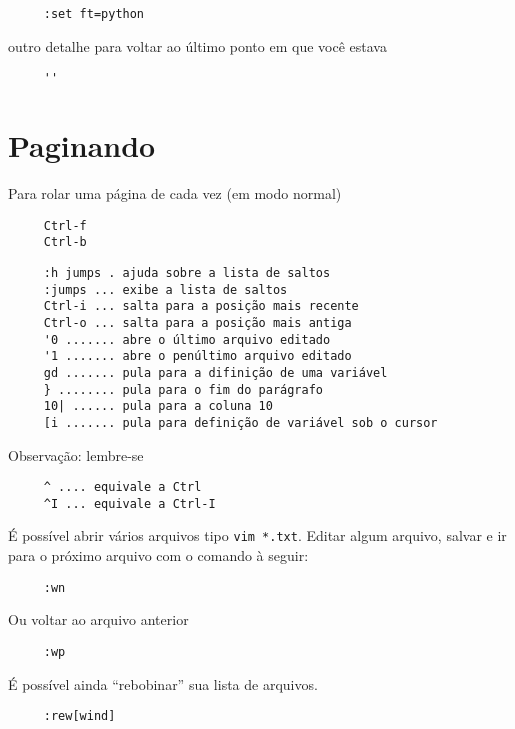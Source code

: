 \begin{verbatim}
     :set ft=python
\end{verbatim}

outro detalhe para voltar ao último ponto em que você estava

\begin{verbatim}
     ''
\end{verbatim}

\section{Paginando}
\label{Paginando}

Para rolar uma página de cada vez (em modo normal)

\begin{verbatim}
     Ctrl-f
     Ctrl-b
\end{verbatim}


\begin{verbatim}
     :h jumps . ajuda sobre a lista de saltos
     :jumps ... exibe a lista de saltos
     Ctrl-i ... salta para a posição mais recente
     Ctrl-o ... salta para a posição mais antiga
     '0 ....... abre o último arquivo editado
     '1 ....... abre o penúltimo arquivo editado
     gd ....... pula para a difinição de uma variável
     } ........ pula para o fim do parágrafo
     10| ...... pula para a coluna 10
     [i ....... pula para definição de variável sob o cursor
\end{verbatim}

Observação: lembre-se

\begin{verbatim}
     ^ .... equivale a Ctrl
     ^I ... equivale a Ctrl-I
\end{verbatim}

É possível abrir vários arquivos tipo \verb|vim *.txt|. Editar
algum arquivo, salvar e ir para o próximo arquivo com o comando à
seguir:

\begin{verbatim}
     :wn
\end{verbatim}

Ou voltar ao arquivo anterior

\begin{verbatim}
     :wp
\end{verbatim}

É possível ainda ``rebobinar'' sua lista de arquivos.

\begin{verbatim}
     :rew[wind]
\end{verbatim}

